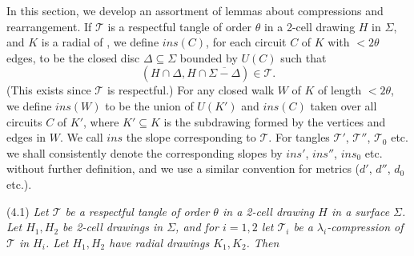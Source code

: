 In this section, we develop an assortment of lemmas about compressions and rearrangement. If $\mathcal{T}$ is a respectful tangle of order $\theta$ in a 2-cell drawing $H$ in $\Sigma$, and $K$ is a radial   of , we define $ins(C)$, for each circuit $C$ of $K$ with $<2\theta$ edges, to be the closed disc $\Delta \subseteq \Sigma$ bounded by $U(C)$ such that
\begin{equation*}
(H \cap \Delta, H \cap \overline{\Sigma - \Delta}) \in \mathcal{T}.
\end{equation*}
(This exists since $\mathcal{T}$ is respectful.) For any closed walk $W$ of $K$ of length $<2\theta$, we define $ins(W)$ to be the union of $U(K')$ and $ins(C)$ taken over all circuits $C$ of $K'$, where $K' \subseteq K$ is the subdrawing formed by the vertices and edges in $W$. We call $ins$ the slope corresponding to $\mathcal{T}$. For tangles $\mathcal{T}'$, $\mathcal{T}''$, $\mathcal{T}_0$ etc. we shall consistently denote the corresponding slopes by $ins'$, $ins''$, $ins_0$ etc. without further definition, and we use a similar convention for metrics ($d'$, $d''$, $d_0$ etc.).

\stmt
(4.1) \textit{Let $\mathcal{T}$ be a respectful tangle of order $\theta$ in a 2-cell drawing $H$ in a surface $\Sigma$. Let $H_1, H_2$ be 2-cell drawings in $\Sigma$, and for $i = 1, 2$ let $\mathcal{T}_i$ be a $\lambda_i$-compression of $\mathcal{T}$ in $H_i$. Let $H_1, H_2$ have radial drawings $K_1, K_2$. Then}
